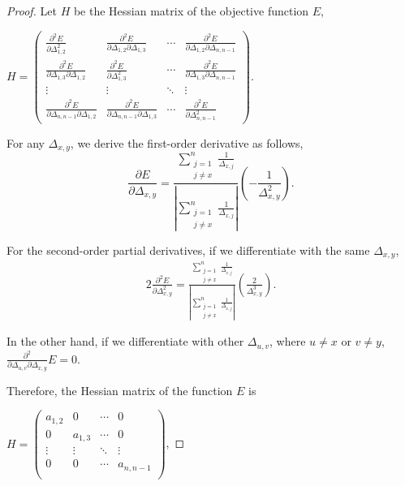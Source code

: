\begin{proof}
Let $H$ be the Hessian matrix of the objective function $E$,

$H = 
\begin{pmatrix} 
{\frac{\partial^2 E}{\partial \Delta_{1,2}^2}}  & {\frac{\partial^2 E}{\partial \Delta_{1,2}\partial\Delta_{1,3}}}  & \cdots & {\frac{\partial^2 E}{\partial \Delta_{1,2}\partial \Delta_{n,n-1}}} \\ 
{\frac{\partial^2 E}{\partial \Delta_{1,3}\partial \Delta_{1,2}}}  & {\frac{\partial^2 E}{\partial \Delta_{1,3}^2}} & \cdots & {\frac{\partial^2 E}{\partial \Delta_{1,3}\partial \Delta_{n,n-1}}} \\ 
\vdots & \vdots & \ddots & \vdots \\
{\frac{\partial^2 E}{\partial \Delta_{n,n-1}\partial \Delta_{1,2}}} & {\frac{\partial^2 E}{\partial \Delta_{n,n-1}\partial \Delta_{1,3}}} & \cdots & {\frac{\partial^2 E}{\partial \Delta_{n,n-1}^2}}
\end{pmatrix}$.

For any $\Delta_{x,y}$, we derive the first-order derivative as follows,
\begin{equation}
{\frac{\partial E}{\partial \Delta_{x,y}}} = \frac{\sum_{\substack{j=1\\j \neq x}}^{n} \frac{1}{\Delta_{x,j}} }{\left| \sum_{\substack{j=1\\j \neq x}}^{n} \frac{1}{\Delta_{x,j}} \right|} \left( - \frac{1}{\Delta_{x,y}^2} \right). \nonumber
\end{equation}

For the second-order partial derivatives, if we differentiate with the same $\Delta_{x,y}$, 
\begin{alignat}{2}
{\frac{\partial^2 E}{\partial \Delta_{x,y}^2}} = \frac{\sum_{\substack{j=1\\j \neq x}}^{n} \frac{1}{\Delta_{x,j}} }{\left| \sum_{\substack{j=1\\j \neq x}}^{n} \frac{1}{\Delta_{x,j}} \right|} \left( \frac{2}{\Delta_{x,y}^3} \right). \nonumber
\end{alignat}

In the other hand, if we differentiate with other $\Delta_{u,v}$, where $u \neq x$ or $v \neq y$, ${\frac{\partial^2}{\partial \Delta_{u,v}\partial\Delta_{x,y}}}E = 0$.

Therefore, the Hessian matrix of the function $E$ is

$H = 
\begin{pmatrix} 
a_{1,2} & 0 & \cdots & 0 \\ 
0 & a_{1,3} & \cdots & 0 \\ 
\vdots & \vdots & \ddots & \vdots \\
0 & 0 & \cdots & a_{n, n-1} \\ 
\end{pmatrix}$,


\end{proof}
